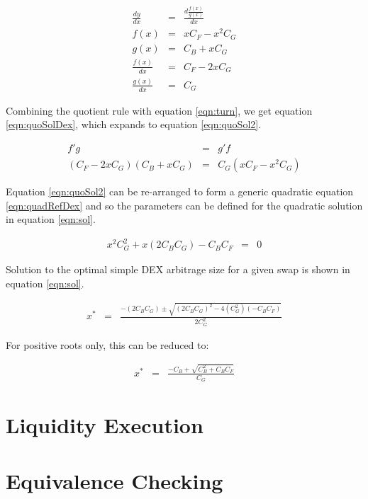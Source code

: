 \documentclass[runningheads]{llncs}
\begin{document}
	\begin{eqnarray}
		\frac{dy}{dx} &=& \frac{d \frac{ f(x)}{g(x)}}{dx} \label{eqn:turn2}\\
		f(x) &=& x C_{F} - x^2 C_{G} \label{eqn:f}\\
		g(x) &=& C_{B} + x C_{G} \label{eqn:g}\\
		\frac{f(x)}{dx} &=& C_{F} - 2 x C_{G} \label{eqn:fdash}\\
		\frac{g(x)}{dx} &=& C_{G} \label{eqn:gdash}
	\end{eqnarray}
	
	Combining the quotient rule with equation \ref{eqn:turn}, we get equation \ref{eqn:quoSolDex}, which expands to equation \ref{eqn:quoSol2}.
	
	\begin{eqnarray}
		f'g &=& g'f \label{eqn:quoSolDex}\\
		(C_{F} - 2 x C_{G})(C_{B} + x C_{G}) &=& C_{G} ( x C_{F} - x^2 C_{G}) \label{eqn:quoSol2}
	\end{eqnarray}
	
	Equation \ref{eqn:quoSol2} can be re-arranged to form a generic quadratic equation \ref{eqn:quadRefDex} and so the parameters can be defined for the quadratic solution in equation \ref{eqn:sol}.
	
	\begin{eqnarray}
		x^2 C_{G}^2 + x(2 C_{B} C_{G}) - C_{B} C_{F} &=& 0 \label{eqn:quadRefDex}
	\end{eqnarray}
	
	Solution to the optimal simple DEX arbitrage size for a given swap is shown in equation \ref{eqn:sol}.
	
	\begin{eqnarray}
		x^* &=& \frac{-(2 C_{B} C_{G}) \pm \sqrt{(2 C_{B} C_{G})^2 - 4(C_{G}^2)(- C_{B} C_{F})}}{2 C_{G}^2} \label{eqn:sol}
	\end{eqnarray}
	
	For positive roots only, this can be reduced to:
	
	\begin{eqnarray}
		x^* &=& \frac{- C_{B} + \sqrt{C_{B} ^2 + C_{B} C_{F}}}{C_{G}} \label{eqn:sol2}
	\end{eqnarray}
	

\section{Liquidity Execution}

\section{Equivalence Checking}
\end{document}

